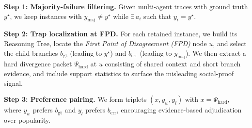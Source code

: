 \documentclass{article}
\theoremstyle{plain}
\theoremstyle{definition}
\theoremstyle{remark}
\begin{document}
\textbf{Step 1: Majority-failure filtering.}
Given multi-agent traces with ground truth $y^\star$, we keep instances with $y_{\mathrm{maj}}\neq y^\star$ while $\exists\,a_i$ such that $y_i=y^\star$.

\textbf{Step 2: Trap localization at FPD.}
For each retained instance, we build its Reasoning Tree, locate the \emph{First Point of Disagreement (FPD)} node $u$, and select the child branches
$b_{\mathrm{gt}}$ (leading to $y^\star$) and $b_{\mathrm{err}}$ (leading to $y_{\mathrm{maj}}$).
We then extract a hard divergence packet $\Psi_{\mathrm{hard}}$ at $u$ consisting of shared context and short branch evidence, and include support statistics to surface the misleading social-proof signal.

\textbf{Step 3: Preference pairing.}
We form triplets $(x,y_w,y_l)$ with $x=\Psi_{\mathrm{hard}}$, where $y_w$ prefers $b_{\mathrm{gt}}$ and $y_l$ prefers $b_{\mathrm{err}}$, encouraging evidence-based adjudication over popularity.




\end{document}
